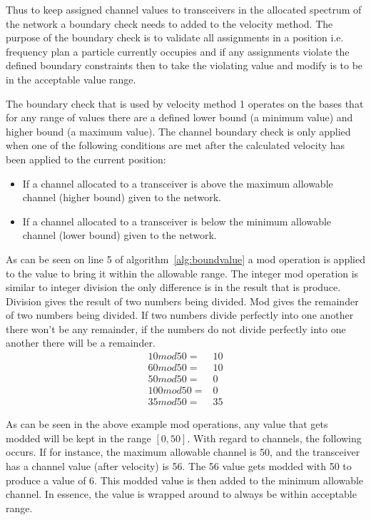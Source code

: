 Thus to keep assigned channel values to transceivers in the allocated spectrum of the network a boundary check needs to added to the velocity method. The purpose of the boundary check is to validate all assignments in a position i.e. frequency plan a particle currently occupies and if any assignments violate the defined boundary constraints then to take the violating value and modify is to be in the acceptable value range.

The boundary check that is used by velocity method 1 operates on the bases that for any range of values there are a defined lower bound (a minimum value) and higher bound (a maximum value). The channel boundary check is only applied when one of the following conditions are met after the calculated velocity has been applied to the current position:
\begin{itemize}
\item If a channel allocated to a transceiver is above the maximum allowable channel (higher bound) given to the network. 
\item If a channel allocated to a transceiver is below the minimum allowable channel (lower bound) given to the network.
\end{itemize}

As can be seen on line 5 of algorithm~\ref{alg:boundvalue} a mod operation is applied to the value to bring it within the allowable range. The integer mod operation is similar to integer division the only difference is in the result that is produce. Division gives the result of two numbers being divided. Mod gives the remainder of two numbers being divided. If two numbers divide perfectly into one another there won't be any remainder, if the numbers do not divide perfectly into one another there will be a remainder. 
\begin{align}
	10 mod 50 =& 10 \\
	60 mod 50 =& 10 \\
	50 mod 50 =& 0 \\
	100 mod 50 =& 0 \\
	35 mod 50 =& 35 
\end{align}

As can be seen in the above example mod operations, any value that gets modded will be kept in the range $[0,50]$. With regard to channels, the following occurs. If for instance, the maximum allowable channel is 50, and the transceiver has a channel value (after velocity) is 56. The 56 value gets modded with 50 to produce a value of 6. This modded value is then added to the minimum allowable channel. In essence, the value is wrapped around to always be within acceptable range. 

